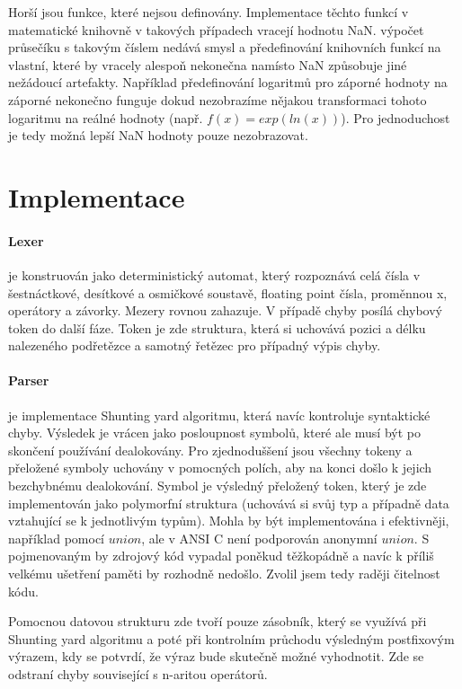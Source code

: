 \documentclass[11pt]{article}
\begin{document}
Horší jsou funkce, které nejsou definovány. Implementace
těchto funkcí v matematické knihovně v takových případech vracejí hodnotu NaN.
výpočet průsečíku s takovým číslem nedává smysl a předefinování knihovních
funkcí na vlastní, které by vracely alespoň nekonečna namísto NaN způsobuje
jiné nežádoucí artefakty. Například předefinování logaritmů pro záporné hodnoty
na záporné nekonečno funguje dokud nezobrazíme nějakou transformaci tohoto
logaritmu na reálné hodnoty (např. $f(x) = exp(ln(x))$). Pro jednoduchost je
tedy možná lepší NaN hodnoty pouze nezobrazovat.



\section{Implementace}
\paragraph{Lexer} 
je konstruován jako deterministický automat, který rozpoznává celá čísla v
šestnáctkové, desítkové a osmičkové soustavě, floating point čísla, proměnnou
x, operátory a závorky. Mezery rovnou zahazuje. V případě chyby posílá chybový
token do další fáze.  Token je zde struktura, která si uchovává pozici a délku
nalezeného podřetězce a samotný řetězec pro případný výpis chyby.

\paragraph{Parser}
je implementace Shunting yard algoritmu, která navíc kontroluje syntaktické
chyby. Výsledek je vrácen jako posloupnost symbolů, které ale musí být po
skončení používání dealokovány. Pro zjednoduššení jsou všechny tokeny a
přeložené symboly uchovány v pomocných polích, aby na konci došlo k jejich
bezchybnému dealokování. Symbol je výsledný přeložený token, který je zde
implementován jako polymorfní struktura (uchovává si svůj typ a případně data
vztahující se k jednotlivým typům). Mohla by být implementována i efektivněji,
například pomocí $union$, ale v ANSI C není podporován anonymní $union$. S
pojmenovaným by zdrojový kód vypadal poněkud těžkopádně a navíc k příliš
velkému ušetření paměti by rozhodně nedošlo. Zvolil jsem tedy raději čitelnost
kódu. 

Pomocnou datovou strukturu zde tvoří pouze zásobník, který se využívá při
Shunting yard algoritmu a poté při kontrolním průchodu výsledným postfixovým
výrazem, kdy se potvrdí, že výraz bude skutečně možné vyhodnotit. Zde se odstraní chyby související s n-aritou operátorů.
\end{document}
